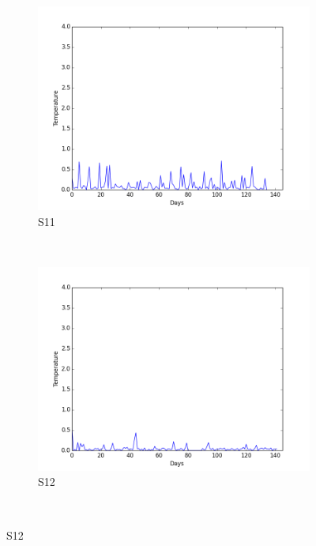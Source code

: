 \documentclass[12pt]{article} %
\begin{document}
\begin{figure}[H]
    \centering
    \begin{subfigure}[b]{0.30\textwidth}
        \includegraphics[width=\textwidth]{img/graphs/11-gsr-1}
        \caption{S11}
        \label{fig:s11GSR}
    \end{subfigure}
    ~ %
    \begin{subfigure}[b]{0.30\textwidth}
        \includegraphics[width=\textwidth]{img/graphs/12-gsr-1}
        \caption{S12}
        \label{fig:s12GSR}
    \end{subfigure}
    ~ %

\end{figure}
\end{document}
